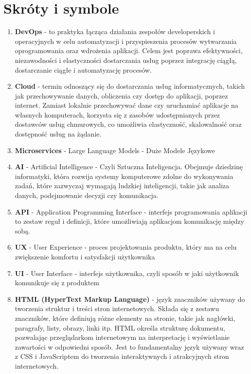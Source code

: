 \section{Skróty i symbole}

 \begin{enumerate}
    \item {\bf DevOps} - to praktyka łącząca działania zespołów developerskich i operacyjnych w celu automatyzacji i przyspieszenia procesów wytwarzania oprogramowania oraz wdrożenia aplikacji. Celem jest poprawa efektywności, niezawodności i elastyczności dostarczania usług poprzez integrację ciągłą, dostarczanie ciągłe i automatyzację procesów.
    
    \item {\bf Cloud} -  termin odnoszący się do dostarczania usług informatycznych, takich jak przechowywanie danych, obliczenia czy dostęp do aplikacji, poprzez internet. Zamiast lokalnie przechowywać dane czy uruchamiać aplikacje na własnych komputerach, korzysta się z zasobów udostępnianych przez dostawców usług chmurowych, co umożliwia elastyczność, skalowalność oraz dostępność usług na żądanie.
    
    \item {\bf Microservices} - Large Language Models - Duże Modele Językowe
    
    \item {\bf AI} - Artificial Intelligence - Czyli Sztuczna Inteligencja. Obejmuje dziedzinę informatyki, która rozwija systemy komputerowe zdolne do wykonywania zadań, które zazwyczaj wymagają ludzkiej inteligencji, takie jak analiza danych, podejmowanie decyzji czy komunikacja.
    
    \item {\bf API} - Application Programming Interface - interfejs programowania aplikacji to zestaw reguł i definicji, które umożliwiają aplikacjom komunikację między sobą.
    
    \item {\bf UX} - User Experience - proces projektowania produktu, który ma na celu zwiększenie komfortu i satysfakcji użytkownika
    
    \item {\bf UI} - User Interface - interfejs użytkownika, czyli sposób w jaki użytkownik komunikuje się z produktem
   
    \item {\bf HTML (HyperText Markup Language)} - język znaczników używany do tworzenia struktur i treści stron internetowych. Składa się z zestawu znaczników, które definiują różne elementy na stronie, takie jak nagłówki, paragrafy, listy, obrazy, linki itp. HTML określa strukturę dokumentu, pozwalając przeglądarkom internetowym na interpretację i wyświetlanie zawartości w odpowiedni sposób. Jest to fundamentalny język używany wraz z CSS i JavaScriptem do tworzenia interaktywnych i atrakcyjnych stron internetowych.
    

\end{enumerate}
